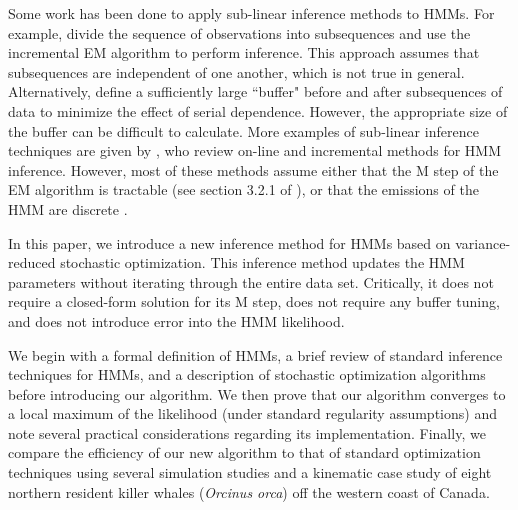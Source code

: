 Some work has been done to apply sub-linear inference methods to HMMs.
For example, \citet{Gotoh:1998} divide the sequence of observations into subsequences
and use the incremental EM algorithm to perform inference. This approach assumes that subsequences are independent of one another, which is not true in general. Alternatively, \citet{Ye:2017} define a sufficiently large ``buffer" before and after subsequences of data to minimize the effect of serial dependence. %
However, the appropriate size of the buffer can be difficult to calculate. %
More examples of sub-linear inference techniques are given by \citet{Khreich:2012}, who review on-line and incremental methods for HMM inference. However, most of these methods assume either that the M step of the EM algorithm is tractable (see section 3.2.1 of \citet{Khreich:2012}), or that the emissions of the HMM are discrete \citep{Baldi:1993}. 

In this paper, we introduce a new inference method for HMMs based on variance-reduced stochastic optimization. This inference method updates the HMM parameters without iterating through the entire data set. Critically, it does not require a closed-form solution for its M step, does not require any buffer tuning, and does not introduce error into the HMM likelihood.

We begin with a formal definition of HMMs, a brief review of standard inference techniques for HMMs, and a description of stochastic optimization algorithms before introducing our algorithm. We then prove that our algorithm converges to a local maximum of the likelihood (under standard regularity assumptions) and note several practical considerations regarding its implementation. Finally, %
we compare the efficiency of our new algorithm to that of standard optimization techniques using several simulation studies and a kinematic case study of eight northern resident killer whales ({\em{Orcinus orca}}) off the western coast of Canada. 

